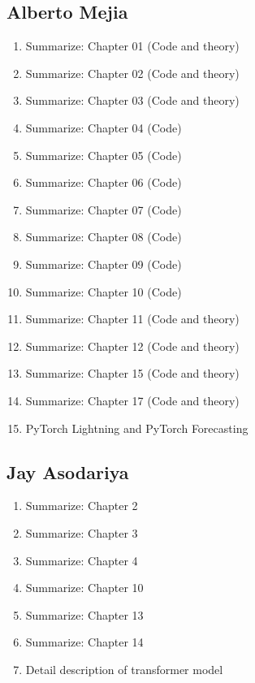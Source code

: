 \documentclass{article}
\begin{document}
\subsection{Alberto Mejia}
\begin{enumerate}
    \item Summarize: Chapter 01 (Code and theory)
    \item Summarize: Chapter 02 (Code and theory)
    \item Summarize: Chapter 03 (Code and theory)
    \item Summarize: Chapter 04 (Code)
    \item Summarize: Chapter 05 (Code)
    \item Summarize: Chapter 06 (Code)
    \item Summarize: Chapter 07 (Code)
    \item Summarize: Chapter 08 (Code)
    \item Summarize: Chapter 09 (Code)
    \item Summarize: Chapter 10 (Code)
    \item Summarize: Chapter 11 (Code and theory)
    \item Summarize: Chapter 12 (Code and theory)
    \item Summarize: Chapter 15 (Code and theory)
    \item Summarize: Chapter 17 (Code and theory)
    \item PyTorch Lightning and PyTorch Forecasting
    
\end{enumerate}

\subsection{Jay Asodariya}
\begin{enumerate}
    \item Summarize: Chapter 2 
    \item Summarize: Chapter 3 
    \item Summarize: Chapter 4 
    \item Summarize: Chapter 10 
    \item Summarize: Chapter 13 
    \item Summarize: Chapter 14
    \item Detail description of transformer model
\end{enumerate}
\end{document}
